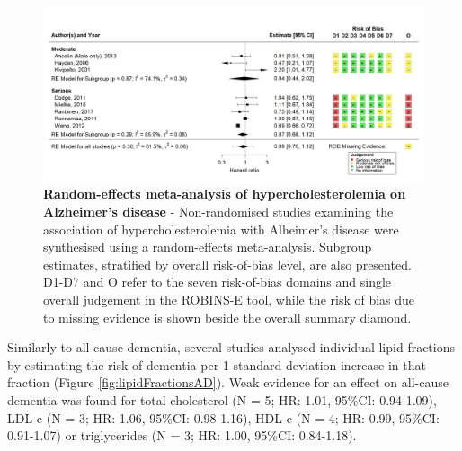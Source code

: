 \documentclass[a4paper, twoside]{templates/ociamthesis}
\begin{document}
\begin{figure}[H]
\includegraphics[width=1\linewidth]{figures/sys-rev/fp_obs_hyperchol_AD} \caption[Random-effects meta-analysis of hypercholesterolemia on Alzheimer's disease]{\textbf{Random-effects meta-analysis of hypercholesterolemia on Alzheimer's disease} - Non-randomised studies examining the association of hypercholesterolemia with Alheimer's disease were synthesised using a random-effects meta-analysis. Subgroup estimates, stratified by overall risk-of-bias level, are also presented. D1-D7 and O refer to the seven risk-of-bias domains and single overall judgement in the ROBINS-E tool, while the risk of bias due to missing evidence is shown beside the overall summary diamond.}\label{fig:obsHyperAD}
\end{figure}

Similarly to all-cause dementia, several studies analysed individual lipid fractions by estimating the risk of dementia per 1 standard deviation increase in that fraction (Figure \ref{fig:lipidFractionsAD}). Weak evidence for an effect on all-cause dementia was found for total cholesterol (N = 5; HR: 1.01, 95\%CI: 0.94-1.09), LDL-c (N = 3; HR: 1.06, 95\%CI: 0.98-1.16), HDL-c (N = 4; HR: 0.99, 95\%CI: 0.91-1.07) or triglycerides (N = 3; HR: 1.00, 95\%CI: 0.84-1.18).

\newpage
\thispagestyle{empty}
\end{document}
